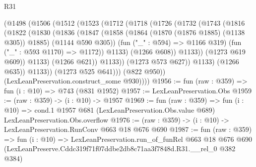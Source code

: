 \begin{lexlean}{R31}
\begin{coremodule}
                  (@1498
                    (@1506
                      (@1512
                        (@1523
                          (@1712
                            (@1718
                              (@1726
                                (@1732
                                  (@1743
                                    (@1816
                                      (@1822
                                        (@1830
                                          (@1836
                                            (@1847
                                              (@1858
                                                (@1864 (@1870 (@1876 @1885) (@1138 @305)) @1885)
                                                (@1144 @590 @305))
                                              (fun ("_" : @594) => @1166 @319)
                                              (fun ("_" : @593 @1170) => @1172))
                                            @1133)
                                          (@1266 @608))
                                        @1133))
                                    (@1273 @619 @609))
                                  @1133)
                                (@1266 @621))
                              @1133))
                          (@1273 @573 @627))
                        @1133)
                      (@1266 @635))
                    @1133))
                (@1273 @525 @641)))
            (@822 @950))
          (LexLeanPreservation.construct_some @930))))
@1956 := fun (raw : @359) => fun (i : @10) => @743 (@831 @1952)
@1957 := LexLeanPreservation.Obs
@1959 := (raw : @359) -> (i : @10) -> @1957
@1969 := fun (raw : @359) =>
  fun (i : @10) =>
  cond.{1} @1957 @681 (LexLeanPreservation.Obs.value @689) LexLeanPreservation.Obs.overflow
@1976 := (raw : @359) -> (i : @10) -> LexLeanPreservation.RunConv @663 @18 @676 @690
@1987 := fun (raw : @359) =>
  fun (i : @10) =>
  LexLeanPreservation.run_of_funRel
    @663
    @18
    @676
    @690
    (LexLeanPreserve.Cddc319f71f07ddbe2db8c71aa3f7848d.R31.__rel_0 @382 @384)
\end{coremodule}
\end{lexlean}
